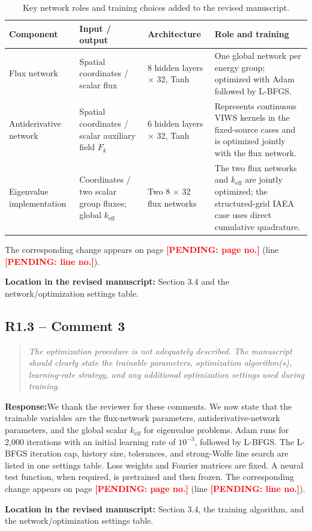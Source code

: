 \documentclass[11pt,a4paper]{article}
\newenvironment{reviewercomment}{\begin{quote}\small\itshape\color{commentgray}}{\end{quote}}
\newcommand{\authorresponse}{\noindent\textbf{Response:}\quad}
\newcommand{\revisionlocation}[1]{\par\noindent\textcolor{locationblue}{\textbf{Location in the revised manuscript: }}#1}
\newcommand{\draftplaceholder}[1]{\textcolor{red}{\textbf{[PENDING: #1]}}}
\begin{document}
\begin{table}[H]
\centering
\small
\caption{Key network roles and training choices added to the revised manuscript.}
\label{tab:response_network_settings}
\renewcommand{\arraystretch}{1.15}
\begin{tabularx}{0.98\textwidth}{@{}p{2.7cm}p{2.6cm}p{2.4cm}X@{}}
\toprule
Component & Input / output & Architecture & Role and training \\
\midrule
Flux network & Spatial coordinates / scalar flux & 8 hidden layers $\times$ 32, Tanh & One global network per energy group; optimized with Adam followed by L-BFGS. \\
Antiderivative network & Spatial coordinates / scalar auxiliary field $F_k$ & 6 hidden layers $\times$ 32, Tanh & Represents continuous VIWS kernels in the fixed-source cases and is optimized jointly with the flux network. \\
Eigenvalue implementation & Coordinates / two scalar group fluxes; global $k_{\mathrm{eff}}$ & Two 8 $\times$ 32 flux networks & The two flux networks and $k_{\mathrm{eff}}$ are jointly optimized; the structured-grid IAEA case uses direct cumulative quadrature. \\
\bottomrule
\end{tabularx}
\end{table}
The corresponding change appears on page \draftplaceholder{page no.} (line \draftplaceholder{line no.}).
\revisionlocation{Section 3.4 and the network/optimization settings table.}

\subsection*{R1.3 -- Comment 3}
\begin{reviewercomment}
The optimization procedure is not adequately described. The manuscript should clearly state the trainable parameters, optimization algorithm(s), learning-rate strategy, and any additional optimization settings used during training.
\end{reviewercomment}
\authorresponse We thank the reviewer for these comments. We now state that the trainable variables are the flux-network parameters, antiderivative-network parameters, and the global scalar $k_{\mathrm{eff}}$ for eigenvalue problems. Adam runs for 2,000 iterations with an initial learning rate of $10^{-3}$, followed by L-BFGS. The L-BFGS iteration cap, history size, tolerances, and strong-Wolfe line search are listed in one settings table. Loss weights and Fourier matrices are fixed. A neural test function, when required, is pretrained and then frozen. The corresponding change appears on page \draftplaceholder{page no.} (line \draftplaceholder{line no.}).
\revisionlocation{Section 3.4, the training algorithm, and the network/optimization settings table.}
\end{document}
